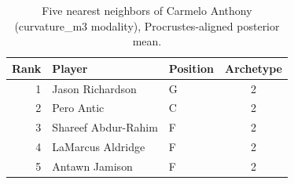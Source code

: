 \begin{table}[htbp]
  \centering\small
  \begin{tabular}{rllc}
    \toprule
    Rank & Player & Position & Archetype \\
    \midrule
    1 & Jason Richardson & G & 2 \\
    2 & Pero Antic & C & 2 \\
    3 & Shareef Abdur-Rahim & F & 2 \\
    4 & LaMarcus Aldridge & F & 2 \\
    5 & Antawn Jamison & F & 2 \\
    \bottomrule
  \end{tabular}
  \caption{Five nearest neighbors of Carmelo Anthony (curvature_m3 modality), Procrustes-aligned posterior mean.}
  \label{tab:Carmelo_Anthony_neighbors_curvature_m3}
\end{table}

